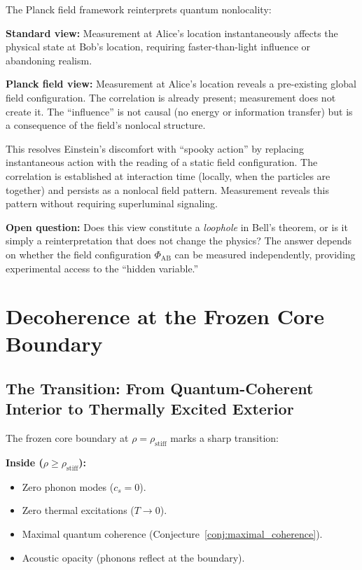 \documentclass[11pt,a4paper]{article}
\newcommand{\rhostiff}{\ensuremath{\rho_{\mathrm{stiff}}}}
\theoremstyle{definition}
\theoremstyle{remark}
\begin{document}
The Planck field framework reinterprets quantum nonlocality:

\textbf{Standard view:} Measurement at Alice's location instantaneously affects the physical state at Bob's location, requiring faster-than-light influence or abandoning realism.

\textbf{Planck field view:} Measurement at Alice's location reveals a pre-existing global field configuration. The correlation is already present; measurement does not create it. The ``influence'' is not causal (no energy or information transfer) but is a consequence of the field's nonlocal structure.

This resolves Einstein's discomfort with ``spooky action'' by replacing instantaneous action with the reading of a static field configuration. The correlation is established at interaction time (locally, when the particles are together) and persists as a nonlocal field pattern. Measurement reveals this pattern without requiring superluminal signaling.

\textbf{Open question:} Does this view constitute a \emph{loophole} in Bell's theorem, or is it simply a reinterpretation that does not change the physics? The answer depends on whether the field configuration $\Phi_{\mathrm{AB}}$ can be measured independently, providing experimental access to the ``hidden variable.''

\section{Decoherence at the Frozen Core Boundary}
\label{sec:decoherence_boundary}

\subsection{The Transition: From Quantum-Coherent Interior to Thermally Excited Exterior}
\label{sec:frozen_boundary_transition}

The frozen core boundary at $\rho = \rhostiff$ marks a sharp transition:

\textbf{Inside ($\rho \geq \rhostiff$):}
\begin{itemize}[leftmargin=*, itemsep=0.2em]
\item Zero phonon modes ($c_s = 0$).
\item Zero thermal excitations ($T \to 0$).
\item Maximal quantum coherence (Conjecture~\ref{conj:maximal_coherence}).
\item Acoustic opacity (phonons reflect at the boundary).
\end{itemize}
\end{document}
